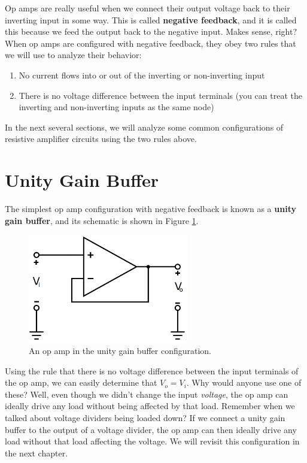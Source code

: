 \par
Op amps are really useful when we connect their output voltage back to their inverting input in some way. This is called \textbf{negative feedback}, and it is called this because we feed the output back to the negative input. Makes sense, right? When op amps are configured with negative feedback, they obey two rules that we will use to analyze their behavior:
\begin{enumerate}
\item No current flows into or out of the inverting or non-inverting input
\item There is no voltage difference between the input terminals (you can treat the inverting and non-inverting inputs as the same node)
\end{enumerate}
In the next several sections, we will analyze some common configurations of resistive amplifier circuits using the two rules above.
\section{Unity Gain Buffer}
The simplest op amp configuration with negative feedback is known as a \textbf{unity gain buffer}, and its schematic is shown in Figure \ref{unityGainBuffer}.
\begin{figure}[h!]
\centering
\includegraphics[width=7cm]{figures/unityGainBuffer.png}
\caption{An op amp in the unity gain buffer configuration.}
\label{unityGainBuffer}
\end{figure}
Using the rule that there is no voltage difference between the input terminals of the op amp, we can easily determine that $V_o=V_i$. Why would anyone use one of these? Well, even though we didn't change the input \textit{voltage}, the op amp can ideally drive any load without being affected by that load. Remember when we talked about voltage dividers being loaded down? If we connect a unity gain buffer to the output of a voltage divider, the op amp can then ideally drive any load without that load affecting the voltage. We will revisit this configuration in the next chapter.

